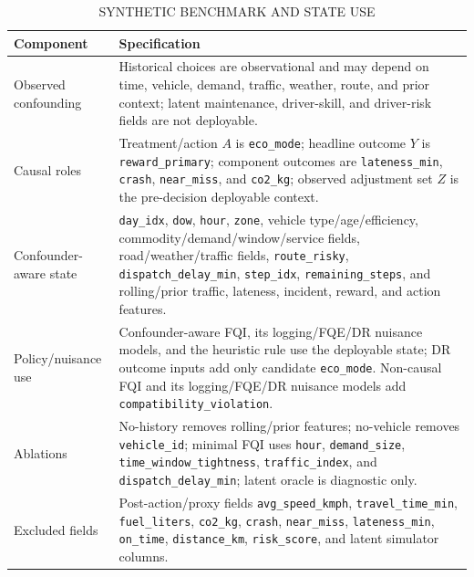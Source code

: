 \documentclass[a4paper,conference]{IEEEtran}
\begin{document}
\begin{table}[!t]
\caption{SYNTHETIC BENCHMARK AND STATE USE}
\label{tab:benchmark_design}
\centering
\footnotesize
\renewcommand{\arraystretch}{0.90}
\setlength{\tabcolsep}{3pt}
\begin{tabular}{>{\raggedright\arraybackslash}p{}>{\raggedright\arraybackslash}p{}}
\toprule
\textbf{Component} & \textbf{Specification} \\
\midrule
Observed confounding & Historical choices are observational and may depend on time, vehicle, demand, traffic, weather, route, and prior context; latent maintenance, driver-skill, and driver-risk fields are not deployable. \\
Causal roles & Treatment/action $A$ is \texttt{eco\_mode}; headline outcome $Y$ is \texttt{reward\_primary}; component outcomes are \texttt{lateness\_min}, \texttt{crash}, \texttt{near\_miss}, and \texttt{co2\_kg}; observed adjustment set $Z$ is the pre-decision deployable context. \\
Confounder-aware state & \texttt{day\_idx}, \texttt{dow}, \texttt{hour}, \texttt{zone}, vehicle type/age/efficiency, commodity/demand/window/service fields, road/weather/traffic fields, \texttt{route\_risky}, \texttt{dispatch\_delay\_min}, \texttt{step\_idx}, \texttt{remaining\_steps}, and rolling/prior traffic, lateness, incident, reward, and action features. \\
Policy/nuisance use & Confounder-aware FQI, its logging/FQE/DR nuisance models, and the heuristic rule use the deployable state; DR outcome inputs add only candidate \texttt{eco\_mode}. Non-causal FQI and its logging/FQE/DR nuisance models add \texttt{compatibility\_violation}. \\
Ablations & No-history removes rolling/prior features; no-vehicle removes \texttt{vehicle\_id}; minimal FQI uses \texttt{hour}, \texttt{demand\_size}, \texttt{time\_window\_tightness}, \texttt{traffic\_index}, and \texttt{dispatch\_delay\_min}; latent oracle is diagnostic only. \\
Excluded fields & Post-action/proxy fields \texttt{avg\_speed\_kmph}, \texttt{travel\_time\_min}, \texttt{fuel\_liters}, \texttt{co2\_kg}, \texttt{crash}, \texttt{near\_miss}, \texttt{lateness\_min}, \texttt{on\_time}, \texttt{distance\_km}, \texttt{risk\_score}, and latent simulator columns. \\
\bottomrule
\end{tabular}
\end{table}
\end{document}

